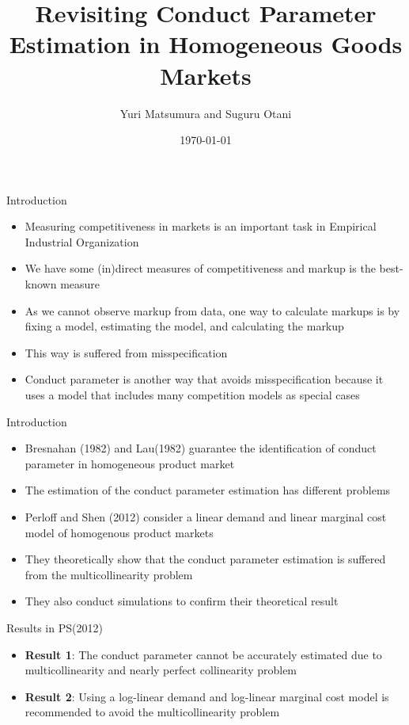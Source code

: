 \documentclass[aspectratio = 169]{beamer}
\title{Revisiting Conduct Parameter Estimation in Homogeneous Goods Markets}
\author{Yuri Matsumura and Suguru Otani}
\date{\today}
\theoremstyle{definition}
\begin{document}
\maketitle

\section{}
\begin{frame}{Introduction}
    \begin{itemize}
        \item Measuring competitiveness in markets is an important task in Empirical Industrial Organization
        \item We have some (in)direct measures of competitiveness and markup is the best-known measure
        \item As we cannot observe markup from data, one way to calculate markups is by fixing a model, estimating the model, and calculating the markup
        \item This way is suffered from misspecification
        \item Conduct parameter is another way that avoids misspecification because it uses a model that includes many competition models as special cases
    \end{itemize}
\end{frame}

\begin{frame}{Introduction}
    \begin{itemize}
        \item Bresnahan (1982) and Lau(1982) guarantee the identification of conduct parameter in homogeneous product market 
        \item The estimation of the conduct parameter estimation has different problems
        \item Perloff and Shen (2012) consider a linear demand and linear marginal cost model of homogenous product markets
        \item They theoretically show that the conduct parameter estimation is suffered from the multicollinearity problem
        \item They also conduct simulations to confirm their theoretical result
    \end{itemize}
\end{frame}


\begin{frame}{Results in PS(2012)}
    \begin{itemize}
        \item \textbf{Result 1}: The conduct parameter cannot be accurately estimated due to multicollinearity and nearly perfect collinearity problem
        \item \textbf{Result 2}: Using a log-linear demand and log-linear marginal cost model is recommended to avoid the multicollinearity problem
    \end{itemize}
\end{frame}
\end{document}

